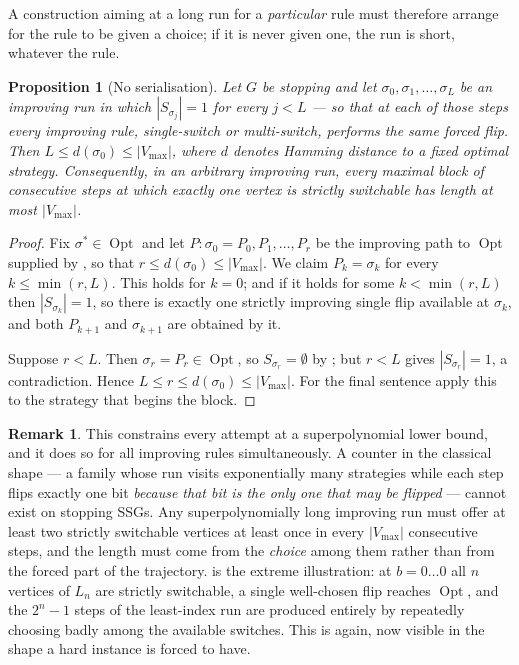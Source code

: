 \documentclass[11pt]{article}
\theoremstyle{plain}
\newtheorem{proposition}[theorem]{Proposition}
\theoremstyle{definition}
\newtheorem{remark}[theorem]{Remark}
\DeclareMathOperator{\Opt}{Opt}
\newcommand{\Vmax}{V_{\max}}
\begin{document}
A construction aiming at a long run for a \emph{particular} rule must
therefore arrange for the rule to be given a choice; if it is never given
one, the run is short, whatever the rule.

\begin{proposition}[No serialisation]\label{prop:serialiser}
Let $G$ be stopping and let $\sigma_0,\sigma_1,\dots,\sigma_L$ be an
improving run in which $|S_{\sigma_j}|=1$ for every $j<L$ --- so that at
each of those steps every improving rule, single-switch or multi-switch,
performs the same forced flip. Then $L\le d(\sigma_0)\le|\Vmax|$, where
$d$ denotes Hamming distance to a fixed optimal strategy. Consequently,
in an arbitrary improving run, every maximal block of consecutive steps
at which exactly one vertex is strictly switchable has length at most
$|\Vmax|$.
\end{proposition}

\begin{proof}
Fix $\sigma^\ast\in\Opt$ and let $P:\sigma_0=P_0,P_1,\dots,P_r$ be the
improving path to $\Opt$ supplied by , so that
$r\le d(\sigma_0)\le|\Vmax|$. We claim $P_k=\sigma_k$ for every
$k\le\min(r,L)$. This holds for $k=0$; and if it holds for some
$k<\min(r,L)$ then $|S_{\sigma_k}|=1$, so there is exactly one strictly
improving single flip available at $\sigma_k$, and both $P_{k+1}$ and
$\sigma_{k+1}$ are obtained by it.

Suppose $r<L$. Then $\sigma_r=P_r\in\Opt$, so $S_{\sigma_r}=\emptyset$ by
; but $r<L$ gives $|S_{\sigma_r}|=1$, a
contradiction. Hence $L\le r\le d(\sigma_0)\le|\Vmax|$. For the final
sentence apply this to the strategy that begins the block.
\end{proof}

\begin{remark}\label{rem:serialiser}
This constrains every attempt at a superpolynomial lower bound, and it
does so for all improving rules simultaneously. A counter in the
classical shape --- a family whose run visits exponentially many
strategies while each step flips exactly one bit \emph{because that bit
is the only one that may be flipped} --- cannot exist on stopping SSGs.
Any superpolynomially long improving run must offer at least two strictly
switchable vertices at least once in every $|\Vmax|$ consecutive steps,
and the length must come from the \emph{choice} among them rather than
from the forced part of the trajectory.  is the extreme
illustration: at $b=0\dots0$ all $n$ vertices of $L_n$ are strictly
switchable, a single well-chosen flip reaches $\Opt$, and the $2^{n}-1$
steps of the least-index run are produced entirely by repeatedly choosing
badly among the available switches. This is  again,
now visible in the shape a hard instance is forced to have.
\end{remark}
\end{document}

